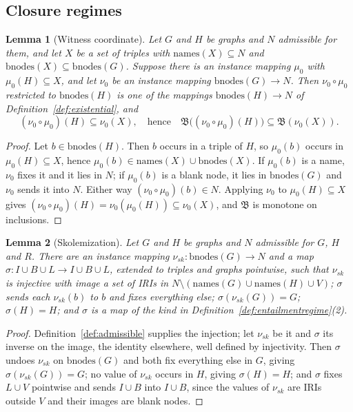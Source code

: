 \documentclass[12pt]{article}
\newtheorem{lemma}{Lemma}
\theoremstyle{definition}
\newcommand{\bmap}{\mathfrak{B}}  %
\begin{document}
\subsection{Closure regimes}
\label{sec:closure}

\begin{lemma}[Witness coordinate]
\label{lem:witness}
Let $G$ and $H$ be graphs and $N$ admissible for them, and let $X$ be a set of triples with $\mathrm{names}(X) \subseteq N$ and $\mathrm{bnodes}(X) \subseteq \mathrm{bnodes}(G)$. Suppose there is an instance mapping $\mu_0$ with $\mu_0(H) \subseteq X$, and let $\nu_0$ be an instance mapping $\mathrm{bnodes}(G) \rightarrow N$. Then $\nu_0 \circ \mu_0$ restricted to $\mathrm{bnodes}(H)$ is one of the mappings $\mathrm{bnodes}(H) \rightarrow N$ of Definition~\ref{def:existential}, and
\[
  (\nu_0 \circ \mu_0)(H) \subseteq \nu_0(X), \quad\text{hence}\quad \bmap\bigl((\nu_0 \circ \mu_0)(H)\bigr) \subseteq \bmap(\nu_0(X)).
\]
\end{lemma}

\begin{proof}
Let $b \in \mathrm{bnodes}(H)$. Then $b$ occurs in a triple of $H$, so $\mu_0(b)$ occurs in $\mu_0(H) \subseteq X$, hence $\mu_0(b) \in \mathrm{names}(X) \cup \mathrm{bnodes}(X)$. If $\mu_0(b)$ is a name, $\nu_0$ fixes it and it lies in $N$; if $\mu_0(b)$ is a blank node, it lies in $\mathrm{bnodes}(G)$ and $\nu_0$ sends it into $N$. Either way $(\nu_0 \circ \mu_0)(b) \in N$. Applying $\nu_0$ to $\mu_0(H) \subseteq X$ gives $(\nu_0 \circ \mu_0)(H) = \nu_0(\mu_0(H)) \subseteq \nu_0(X)$, and $\bmap$ is monotone on inclusions.
\end{proof}

\begin{lemma}[Skolemization]
\label{lem:skolem}
Let $G$ and $H$ be graphs and $N$ admissible for $G$, $H$ and $R$. There are an instance mapping $\nu_{sk}: \mathrm{bnodes}(G) \rightarrow N$ and a map $\sigma : I \cup B \cup L \to I \cup B \cup L$, extended to triples and graphs pointwise, such that $\nu_{sk}$ is injective with image a set of IRIs in $N \setminus (\mathrm{names}(G) \cup \mathrm{names}(H) \cup V)$; $\sigma$ sends each $\nu_{sk}(b)$ to $b$ and fixes everything else; $\sigma(\nu_{sk}(G)) = G$; $\sigma(H) = H$; and $\sigma$ is a map of the kind in Definition~\ref{def:entailmentregime}(2).
\end{lemma}

\begin{proof}
Definition~\ref{def:admissible} supplies the injection; let $\nu_{sk}$ be it and $\sigma$ its inverse on the image, the identity elsewhere, well defined by injectivity. Then $\sigma$ undoes $\nu_{sk}$ on $\mathrm{bnodes}(G)$ and both fix everything else in $G$, giving $\sigma(\nu_{sk}(G)) = G$; no value of $\nu_{sk}$ occurs in $H$, giving $\sigma(H) = H$; and $\sigma$ fixes $L \cup V$ pointwise and sends $I \cup B$ into $I \cup B$, since the values of $\nu_{sk}$ are IRIs outside $V$ and their images are blank nodes.
\end{proof}
\end{document}
